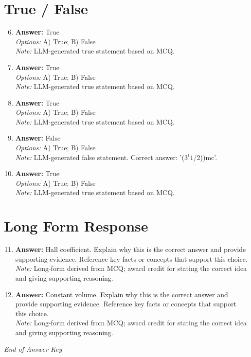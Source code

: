 \documentclass[12pt]{article}
\begin{document}
\section*{True / False}
\begin{enumerate}[label=\arabic*.]
\setcounter{enumi}{5}
\item \textbf{Answer:} True
\\ \textit{Options:} A) True; B) False
\\ \textit{Note:} LLM-generated true statement based on MCQ.
\item \textbf{Answer:} True
\\ \textit{Options:} A) True; B) False
\\ \textit{Note:} LLM-generated true statement based on MCQ.
\item \textbf{Answer:} True
\\ \textit{Options:} A) True; B) False
\\ \textit{Note:} LLM-generated true statement based on MCQ.
\item \textbf{Answer:} False
\\ \textit{Options:} A) True; B) False
\\ \textit{Note:} LLM-generated false statement. Correct answer: '($3^(1$/2))mc'.
\item \textbf{Answer:} True
\\ \textit{Options:} A) True; B) False
\\ \textit{Note:} LLM-generated true statement based on MCQ.
\end{enumerate}

\section*{Long Form Response}
\begin{enumerate}[label=\arabic*.]
\setcounter{enumi}{10}
\item \textbf{Answer:} Hall coefficient. Explain why this is the correct answer and provide supporting evidence. Reference key facts or concepts that support this choice.
\\ \textit{Note:} Long-form derived from MCQ; award credit for stating the correct idea and giving supporting reasoning.
\item \textbf{Answer:} Constant volume. Explain why this is the correct answer and provide supporting evidence. Reference key facts or concepts that support this choice.
\\ \textit{Note:} Long-form derived from MCQ; award credit for stating the correct idea and giving supporting reasoning.
\end{enumerate}

\vfill
\noindent\textit{End of Answer Key}
\end{document}
